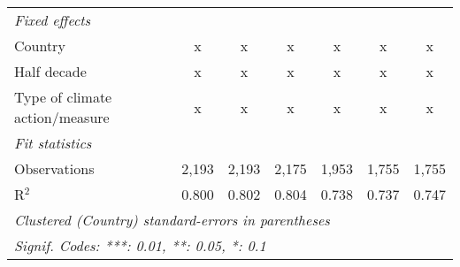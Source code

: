 \begin{tabular}{lcccccc}
   \emph{Fixed effects}\\
   Country                                      & x       & x            & x             & x             & x             & x\\  
   Half decade                                  & x       & x            & x             & x             & x             & x\\  
   Type of climate action/measure               & x       & x            & x             & x             & x             & x\\  
   \midrule \emph{Fit statistics}\\
   Observations                                 & 2,193   & 2,193        & 2,175         & 1,953         & 1,755         & 1,755\\  
   R$^2$                                        & 0.800   & 0.802        & 0.804         & 0.738         & 0.737         & 0.747\\  
   \midrule
   \multicolumn{7}{l}{\emph{Clustered (Country) standard-errors in parentheses}}\\
   \multicolumn{7}{l}{\emph{Signif. Codes: ***: 0.01, **: 0.05, *: 0.1}}\\
\end{tabular}
\par\endgroup


